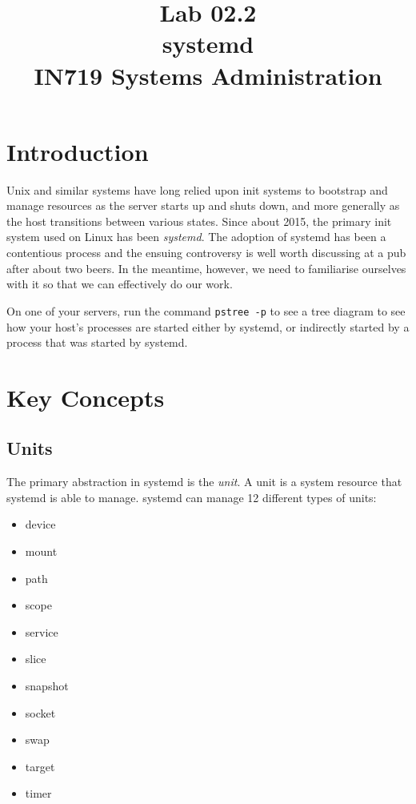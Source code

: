 \documentclass{article}
\begin{document}
\title{Lab 02.2\\systemd\\IN719 Systems Administration}
\date{}
\maketitle

\section{Introduction}
Unix and similar systems have long relied upon init systems to bootstrap and manage resources as the server starts up and shuts down, and more generally as the host transitions between various states. Since about 2015, the primary init system used on Linux has been \emph{systemd}. The adoption of systemd has been a contentious process and the ensuing controversy is well worth discussing at a pub after about two beers. In the meantime, however, we need to familiarise ourselves with it so that we can effectively do our work.

On one of your servers, run the command \texttt{pstree -p} to see a tree diagram to see how your host's processes are started either by systemd, or indirectly started by a process that was started by systemd.

\section{Key Concepts}
\subsection*{Units}
The primary abstraction in systemd is the \emph{unit}. A unit is a system resource that systemd is able to manage. systemd can manage 12 different types of units:

\begin{itemize}
  \item device
  \item mount
  \item path
  \item scope
  \item service
  \item slice
  \item snapshot
  \item socket
  \item swap
  \item target
  \item timer
\end{itemize}
  
\end{document}
